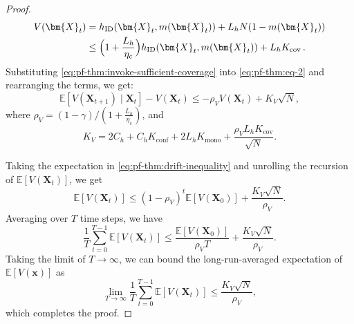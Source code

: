 \documentclass{article}
\theoremstyle{plain}
\theoremstyle{remark}
\newcommand{\E}[1]{\mathbb{E}\left[#1\right]}
\newcommand{\givenplain}{\;|\;}
\newcommand{\mx}{\bm{x}}
\newcommand{\rhov}{\rho_V}
\newcommand{\Kv}{K_V}
\newcommand{\ID}{\textnormal{ID}}
\newcommand{\conf}{\text{conf}}
\newcommand{\mono}{\text{mono}}
\newcommand{\cov}{\text{cov}}
\def\mX{{\bm{X}}}
\newcommand{\EE}{\mathbb{E}}
\newcommand{\mbracket}[1]{\left[#1\right]}
\begin{document}
\begin{proof}
    \begin{align}
        \nonumber
        V(\mX_t) &= h_{\ID}(\mX_t,m(\mX_t)) + L_hN(1-m(\mX_t))\\
        &\leq \Big(1+\frac{L_h}{\eta_c}\Big) h_{\ID}(\mX_t,m(\mX_t)) + L_hK_{\cov}\,. \label{eq:pf-thm:invoke-sufficient-coverage}
    \end{align}
    Substituting \eqref{eq:pf-thm:invoke-sufficient-coverage} into \eqref{eq:pf-thm:eq-2} and rearranging the terms, we get: 
    \begin{equation}
        \label{eq:pf-thm:drift-inequality}
        \EE\mbracket{V(\mX_{t+1}) \givenplain \mX_t}-V(\mX_t) \leq -\rhov V(\mX_t) + \Kv \sqrt{N}, 
    \end{equation}
    where $\rhov = (1-\gamma) / (1+\frac{L_h}{\eta_c})$, and 
    \[
        \Kv = 2C_h +C_h K_{\conf}+2L_hK_{\mono}+ \frac{\rhov L_h K_{\cov}}{\sqrt{N}}. 
    \]
    
    Taking the expectation in \eqref{eq:pf-thm:drift-inequality} and unrolling the recursion of $\E{V(\mX_t)}$, we get
    \begin{equation*}
        \E{V(\mX_{t})} \leq (1-\rhov)^t \E{V(\mX_0)} + \frac{\Kv\sqrt{N}}{\rhov}. 
    \end{equation*}
    Averaging over $T$ time steps, we have 
    \begin{equation}
        \label{eq:pf-thm:final-EV-bound-finite}
        \frac{1}{T} \sum_{t=0}^{T-1} \E{V(\mX_{t})} \leq \frac{\E{V(\mX_0)}}{\rhov T} + \frac{\Kv\sqrt{N}}{\rhov}.
    \end{equation}
    Taking the limit of $T\to\infty$, we can bound the long-run-averaged expectation of $\E{V(\mx)}$ as 
    \begin{equation}
        \label{eq:pf-thm:final-EV-bound}
        \lim_{T\to\infty} \frac{1}{T} \sum_{t=0}^{T-1} \E{V(\mX_{t})} \leq \frac{\Kv\sqrt{N}}{\rhov},
    \end{equation}
    which completes the proof. \qedhere
    \end{proof}
\end{document}
